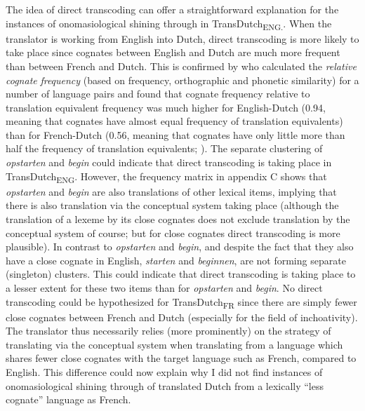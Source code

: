 The idea of direct transcoding can offer a straightforward explanation for the instances of onomasiological shining through in TransDutch\textsubscript{ENG.}. When the translator is working from English into Dutch, direct transcoding is more likely to take place since cognates between English and Dutch are much more frequent than between French and Dutch. This is confirmed by \citet{schepens_cross-language_2013} who calculated the \textit{relative} \textit{cognate} \textit{frequency} (based on frequency, orthographic and phonetic similarity) for a number of language pairs and found that cognate frequency relative to translation equivalent frequency was much higher for English-Dutch (0.94, meaning that cognates have almost equal frequency of translation equivalents) than for French-Dutch (0.56, meaning that cognates have only little more than half the frequency of translation equivalents; \citealt[4]{schepens_cross-language_2013}). The separate clustering of \textit{opstarten} and \textit{begin} could indicate that direct transcoding is taking place in TransDutch\textsubscript{ENG}. However, the frequency matrix in appendix C shows that \textit{opstarten} and \textit{begin} are also translations of other lexical items, implying that there is also translation via the conceptual system taking place (although the translation of a lexeme by its close cognates does not exclude translation by the conceptual system of course; but for close cognates direct transcoding is more plausible). In contrast to \textit{opstarten} and \textit{begin}, and despite the fact that they also have a close cognate in English, \textit{starten} and \textit{beginnen}, are not forming separate (singleton) clusters. This could indicate that direct transcoding is taking place to a lesser extent for these two items than for \textit{opstarten} and \textit{begin}. No direct transcoding could be hypothesized for TransDutch\textsubscript{FR} since there are simply fewer close cognates between French and Dutch (especially for the field of inchoativity). The translator thus necessarily relies (more prominently) on the strategy of translating via the conceptual system when translating from a language which shares fewer close cognates with the target language such as French, compared to English. This difference could now explain why I did not find instances of onomasiological shining through of translated Dutch from a lexically ``less cognate'' language as French.

